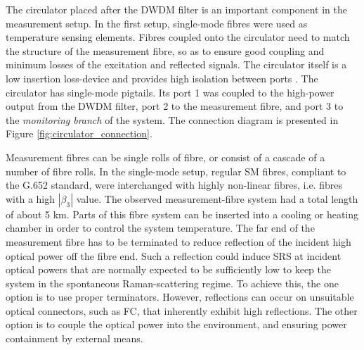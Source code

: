 \documentclass{standalone}
\begin{document}
The circulator placed after the DWDM filter is an important component in the measurement setup. In the first setup, single-mode fibres were used as temperature sensing elements. Fibres coupled onto the circulator need to match the structure of the measurement fibre, so as to ensure good coupling and minimum losses of the excitation and reflected signals. The circulator itself is a low insertion loss-device and provides high isolation between ports \cite{datasheet:smf_circualtor}. The circulator has single-mode pigtails. Its port 1 was coupled to the high-power output from the DWDM filter, port 2 to the measurement fibre, and port 3 to the \textit{monitoring branch} of the system. The connection diagram is presented in Figure \ref{fig:circulator_connection}.

Measurement fibres can be single rolls of fibre, or consist of a cascade of a number of fibre rolls. In the single-mode setup, regular SM fibres, compliant to the G.652 standard, were interchanged with highly non-linear fibres, i.e. fibres with a high $\left|\beta_3\right|$ value. The observed measurement-fibre system had a total length of about 5 km. Parts of this fibre system can be inserted into a cooling or heating chamber in order to control the system temperature. The far end of the measurement fibre has to be terminated to reduce reflection of the incident high optical power off the fibre end. Such a reflection could induce SRS at incident optical powers that are normally expected to be sufficiently low to keep the system in the spontaneous Raman-scattering regime. To achieve this, the one option is to use proper terminators. However, reflections can occur on unsuitable optical connectors, such as FC, that inherently exhibit high reflections. The other option is to couple the optical power into the environment, and ensuring power containment by external means. \\
\end{document}
